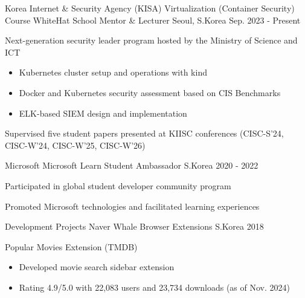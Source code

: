 
\begin{cventries}

\cventry
  {Korea Internet \& Security Agency (KISA) {\enskip\cdotp\enskip} Virtualization (Container Security) Course} %
  {WhiteHat School Mentor \& Lecturer} %
  {Seoul, S.Korea} %
  {Sep. 2023 - Present} %
  {
    \begin{cvitems}
      \item {Next-generation security leader program hosted by the Ministry of Science and ICT}
      \begin{itemize}
        \item {Kubernetes cluster setup and operations with kind}
        \item {Docker and Kubernetes security assessment based on CIS Benchmarks}
        \item {ELK-based SIEM design and implementation}
      \end{itemize}
      \item {Supervised five student papers presented at KIISC conferences (CISC-S'24, CISC-W'24, CISC-W'25, CISC-W'26)}
    \end{cvitems}
  }

\cventry
  {Microsoft} %
  {Microsoft Learn Student Ambassador} %
  {S.Korea} %
  {2020 - 2022} %
  {
    \begin{cvitems}
      \item {Participated in global student developer community program}
      \item {Promoted Microsoft technologies and facilitated learning experiences}
    \end{cvitems}
  }

\cventry
  {Development Projects} %
  {Naver Whale Browser Extensions} %
  {S.Korea} %
  {2018} %
  {
    \begin{cvitems}
      \item {Popular Movies Extension (TMDB)}
      \begin{itemize}
        \item {Developed movie search sidebar extension}
        \item {Rating 4.9/5.0 with 22,083 users and 23,734 downloads (as of Nov. 2024)}
      \end{itemize}
    \end{cvitems}
  }

\end{cventries}